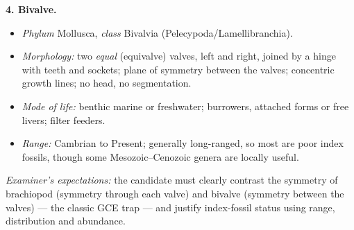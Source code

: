 \documentclass[11pt]{article}
\begin{document}
\begin{corrige}
\textbf{4. Bivalve.}
\begin{itemize}
\item \emph{Phylum} Mollusca, \emph{class} Bivalvia (Pelecypoda/Lamellibranchia).
\item \emph{Morphology:} two \emph{equal} (equivalve) valves, left and right, joined by a hinge with teeth and sockets; plane of symmetry between the valves; concentric growth lines; no head, no segmentation.
\item \emph{Mode of life:} benthic marine or freshwater; burrowers, attached forms or free livers; filter feeders.
\item \emph{Range:} Cambrian to Present; generally long-ranged, so most are poor index fossils, though some Mesozoic--Cenozoic genera are locally useful.
\end{itemize}
\emph{Examiner's expectations:} the candidate must clearly contrast the symmetry of brachiopod (symmetry through each valve) and bivalve (symmetry between the valves) — the classic GCE trap — and justify index-fossil status using range, distribution and abundance.
\end{corrige}
\end{document}
